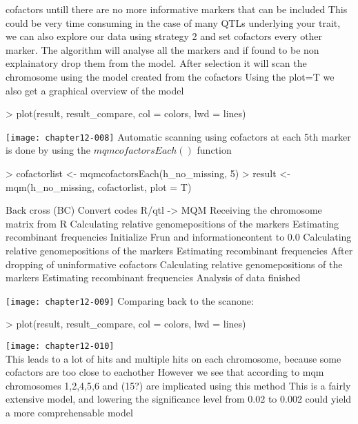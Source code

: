 \documentclass[a4paper]{article}
\begin{document}
cofactors untill there are no more informative markers that can be included
This could be very time consuming in the case of many QTLs underlying your trait,
we can also explore our data using strategy 2 and set cofactors every other marker. The algorithm will analyse
all the markers and if found to be non explainatory drop them from the model. After
selection it will scan the chromosome using the model created from the cofactors
Using the plot=T we also get a graphical overview of the model
\\
\begin{Schunk}
\begin{Sinput}
> plot(result, result_compare, col = colors, lwd = lines)
\end{Sinput}
\end{Schunk}
\texttt{[image: chapter12-008]}
Automatic scanning using cofactors at each 5th marker is done by using the $mqmcofactorsEach()$ function\\
\begin{Schunk}
\begin{Sinput}
> cofactorlist <- mqmcofactorsEach(h_no_missing, 5)
> result <- mqm(h_no_missing, cofactorlist, plot = T)
\end{Sinput}
\begin{Soutput}
Back cross (BC)
Convert codes R/qtl -> MQM
Receiving the chromosome matrix from R
Calculating relative genomepositions of the markers
Estimating recombinant frequencies
Initialize Frun and informationcontent to 0.0
Calculating relative genomepositions of the markers
Estimating recombinant frequencies
After dropping of uninformative cofactors
Calculating relative genomepositions of the markers
Estimating recombinant frequencies
Analysis of data finished
\end{Soutput}
\end{Schunk}
\texttt{[image: chapter12-009]}
Comparing back to the scanone:
\\
\begin{Schunk}
\begin{Sinput}
> plot(result, result_compare, col = colors, lwd = lines)
\end{Sinput}
\end{Schunk}
\texttt{[image: chapter12-010]}
\\
This leads to a lot of hits and multiple hits on each chromosome, because some cofactors are too close to eachother
However we see that according to mqm chromosomes 1,2,4,5,6 and (15?) are implicated using this method
This is a fairly extensive model, and lowering the significance level from 0.02 to 0.002 could yield a more comprehensable model
\end{document}
